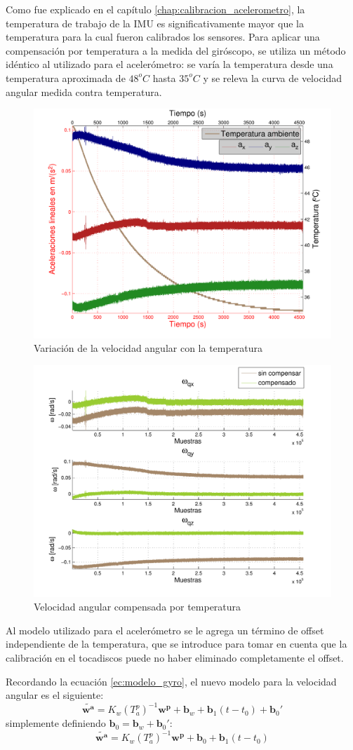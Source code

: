 \documentclass[main]{subfiles}
\begin{document}
Como fue explicado en el capítulo \ref{chap:calibracion_acelerometro}, la temperatura de trabajo de la IMU es significativamente mayor que la temperatura para la cual fueron calibrados los sensores. Para aplicar una compensación por temperatura a la medida del giróscopo, se utiliza un método idéntico al utilizado para el acelerómetro: se varía la temperatura desde una temperatura aproximada de $48^oC$ hasta $35^oC$ y se releva la curva de velocidad angular medida contra temperatura.

\begin{figure}[h!]
	\centering
	\includegraphics[width=.7\textwidth]{./pics_gyro/wtemp.pdf}
	\caption{Variación de la velocidad angular con la temperatura}
	\label{fig:wtemp}
\end{figure}

\begin{figure}[h!]
	\centering
	\includegraphics[width=.9\textwidth]{./pics_gyro/wcompensado.pdf}
	\caption{Velocidad angular compensada por temperatura}
	\label{fig:wcomp}
\end{figure}

Al modelo utilizado para el acelerómetro se le agrega un término de offset independiente de la temperatura, que se introduce para tomar en cuenta que la calibración en el tocadiscos puede no haber eliminado completamente el offset.

Recordando la ecuación \ref{ec:modelo_gyro}, el nuevo modelo para la velocidad angular es el siguiente:
$$\tilde{\mathbf{w^a}}=K_w(T_a^p)^{-1}\mathbf{w^p}+\mathbf{b}_w+\mathbf{b}_1(t-t_0)+\mathbf{b}_0'$$
simplemente definiendo $\mathbf{b}_0=\mathbf{b}_w+\mathbf{b}_0'$:
$$\tilde{\mathbf{w^a}}=K_w(T_a^p)^{-1}\mathbf{w^p}+\mathbf{b}_0+\mathbf{b}_1(t-t_0)$$
\end{document}
